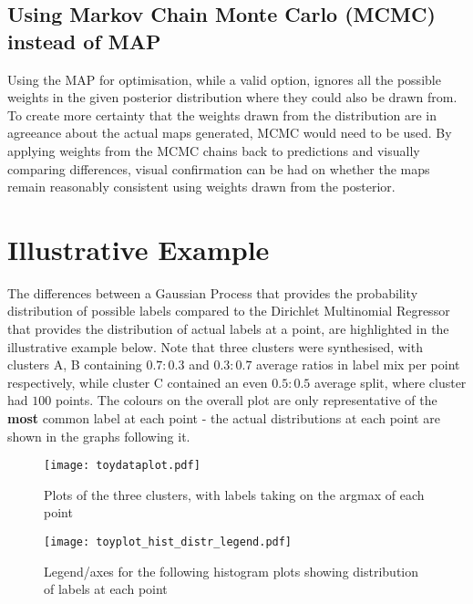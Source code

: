 \subsection{Using Markov Chain Monte Carlo (MCMC) instead of MAP}

Using the MAP for optimisation, while a valid option, ignores all the possible weights in the given posterior distribution where they could also be drawn from. To create more certainty that the weights drawn from the distribution are in agreeance about the actual maps generated, MCMC would need to be used. By applying weights from the MCMC chains back to predictions and visually comparing differences, visual confirmation can be had on whether the maps remain reasonably consistent using weights drawn from the posterior.

\section{Illustrative Example}

The differences between a Gaussian Process that provides the probability distribution of possible labels compared to the Dirichlet Multinomial Regressor that provides the distribution of actual labels at a point, are highlighted in the illustrative example below. Note that three clusters were synthesised, with clusters A, B containing $0.7:0.3$ and $0.3:0.7$ average ratios in label mix per point respectively, while cluster C contained an even $0.5:0.5$ average split, where cluster had $100$ points. The colours on the overall plot are only representative of the \textbf{most} common label at each point - the actual distributions at each point are shown in the graphs following it.


\begin{figure}[H]
    \texttt{[image: toydataplot.pdf]}
    \caption{Plots of the three clusters, with labels taking on the argmax of each point}
    \label{fig:toyplot}
\end{figure}

\begin{figure}[H]
    \texttt{[image: toyplot\_hist\_distr\_legend.pdf]}
    \caption{Legend/axes for the following histogram plots showing distribution of labels at each point}
    \label{fig:toyplothist_legend}
\end{figure}

